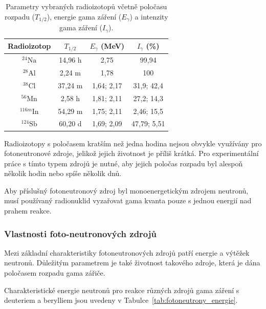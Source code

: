 \begin{table}[h!]
\centering
\caption{Parametry vybraných radioizotopů včetně poločasu rozpadu ($T_{1/2}$), energie gama záření ($E_\gamma$) a intenzity gama záření ($I_\gamma$).}
\label{tab:radioizotopy}
\begin{tabular}{cccc}
\toprule
\textbf{Radioizotop} & \boldmath$T_{1/2}$ & \boldmath$E_\gamma$ \textbf{(MeV)} & \boldmath$I_\gamma$ \textbf{(\%)} \\ \midrule
$^{24}\text{Na}$     & 14,96 h           & 2,75                               & 99,94                             \\ 
$^{28}\text{Al}$     & 2,24 m            & 1,78                               & 100                               \\ 
$^{38}\text{Cl}$     & 37,24 m           & 1,64; 2,17                         & 31,9; 42,4                        \\ 
$^{56}\text{Mn}$     & 2,58 h            & 1,81; 2,11                         & 27,2; 14,3                        \\ 
$^{116m}\text{In}$   & 54,29 m           & 1,75; 2,11                         & 2,46; 15,5                        \\ 
$^{124}\text{Sb}$    & 60,20 d           & 1,69; 2,09                         & 47,79; 5,51                       \\ \bottomrule
\end{tabular}
\end{table}

Radioizotopy s poločasem kratším než jedna hodina nejsou obvykle využívány pro fotoneutronové zdroje, jelikož jejich životnost je příliš krátká. Pro experimentální práce s tímto typem zdrojů je nutné, aby jejich poločas rozpadu byl alespoň několik hodin nebo spíše několik dnů. 

Aby příslušný fotoneutronový zdroj byl monoenergetickým zdrojem neutronů, musí používaný radionuklid vyzařovat gama kvanta pouze s jednou energií nad prahem reakce.


\subsubsection{Vlastnosti foto-neutronových zdrojů}

Mezi základní charakteristiky fotoneutronových zdrojů patří energie a výtěžek neutronů. Důležitým parametrem je také životnost takového zdroje, která je dána poločasem rozpadu gama zářiče.

Charakteristické energie neutronů pro reakce různých zdrojů gama záření s deuteriem a berylliem jsou uvedeny v Tabulce~\ref{tab:fotoneutrony_energie}.

